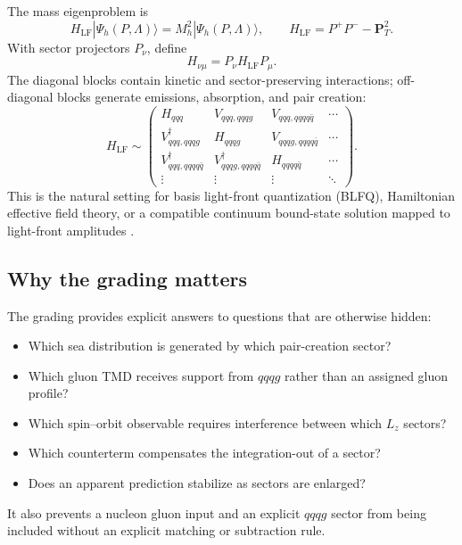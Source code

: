 \documentclass[11pt]{article}
\newcommand{\LF}{\mathrm{LF}}
\begin{document}
The mass eigenproblem is
\begin{equation}
H_{\LF}|\Psi_h(P,\Lambda)\rangle
=M_h^2|\Psi_h(P,\Lambda)\rangle,
\qquad
H_{\LF}=P^+P^- -\bm P_T^2.
\label{eq:lf-eigen}
\end{equation}
With sector projectors \(P_\nu\), define
\begin{equation}
H_{\nu\mu}=P_\nu H_{\LF}P_\mu.
\end{equation}
The diagonal blocks contain kinetic and sector-preserving interactions;
off-diagonal blocks generate emissions, absorption, and pair creation:
\begin{equation}
H_{\LF}\sim
\begin{pmatrix}
H_{qqq} & V_{qqq,qqqg} & V_{qqq,qqqq\bar q}&\cdots\\
V^\dagger_{qqq,qqqg}&H_{qqqg}&V_{qqqg,qqqq\bar q}&\cdots\\
V^\dagger_{qqq,qqqq\bar q}&V^\dagger_{qqqg,qqqq\bar q}
&H_{qqqq\bar q}&\cdots\\
\vdots&\vdots&\vdots&\ddots
\end{pmatrix}.
\label{eq:block-hamiltonian}
\end{equation}
This is the natural setting for basis light-front quantization (BLFQ),
Hamiltonian effective field theory, or a compatible continuum bound-state
solution mapped to light-front amplitudes \cite{Vary2009}.

\subsection{Why the grading matters}

The grading provides explicit answers to questions that are otherwise
hidden:
\begin{itemize}
\item Which sea distribution is generated by which pair-creation sector?
\item Which gluon TMD receives support from \(qqqg\) rather than an assigned
gluon profile?
\item Which spin--orbit observable requires interference between which
\(L_z\) sectors?
\item Which counterterm compensates the integration-out of a sector?
\item Does an apparent prediction stabilize as sectors are enlarged?
\end{itemize}
It also prevents a nucleon gluon input and an explicit \(qqqg\) sector from
being included without an explicit matching or subtraction rule.
\end{document}

